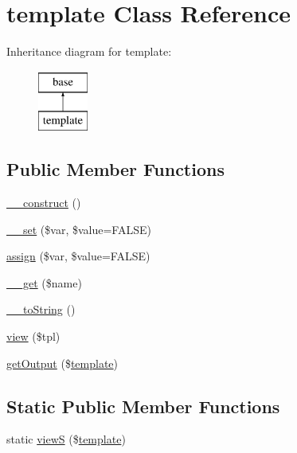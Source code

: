 \hypertarget{classtemplate}{
\section{template Class Reference}
\label{classtemplate}
}
Inheritance diagram for template:\begin{figure}[H]
\begin{center}
\leavevmode
\includegraphics[height=2.000000cm]{classtemplate}
\end{center}
\end{figure}
\subsection*{Public Member Functions}
\begin{DoxyCompactItemize}
\item 
\hyperlink{classtemplate_a095c5d389db211932136b53f25f39685}{\_\-\_\-construct} ()
\item 
\hyperlink{classtemplate_a8ba8e88dc2035039ed49e5d7a9c43093}{\_\-\_\-set} (\$var, \$value=FALSE)
\item 
\hyperlink{classtemplate_aad89b99f86fc0d4fd6a0d0f3f7a15867}{assign} (\$var, \$value=FALSE)
\item 
\hyperlink{classtemplate_abc8e9e31bb15c8a44c3210ec551407c8}{\_\-\_\-get} (\$name)
\item 
\hyperlink{classtemplate_a7516ca30af0db3cdbf9a7739b48ce91d}{\_\-\_\-toString} ()
\item 
\hyperlink{classtemplate_ada2685086f0dc2eb8099c94f7d074885}{view} (\$tpl)
\item 
\hyperlink{classtemplate_abcdc5267dc378cabc6d0d5de589b358b}{getOutput} (\$\hyperlink{classtemplate}{template})
\end{DoxyCompactItemize}
\subsection*{Static Public Member Functions}
\begin{DoxyCompactItemize}
\item 
static \hyperlink{classtemplate_a177589d5a40b626113b51f2e2b1a7eb5}{viewS} (\$\hyperlink{classtemplate}{template})
\end{DoxyCompactItemize}
